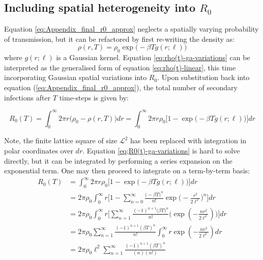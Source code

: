 \subsection{Including spatial heterogeneity into $R_0$}

\label{sec:r0-derivation}
Equation \ref{eq:Appendix_final_r0_approx} neglects a spatially varying probability of transmission, 
but it can be refactored by first re-writing the density as:
\begin{equation}
\label{eq:rho(t)-ga-variations}
    \rho(r, T) = \rho_0\exp \big(-\beta T g(r; \ell) \big)
\end{equation}
where $g(r;\ell)$ is a Gaussian kernel. 
Equation \ref{eq:rho(t)-ga-variations} can be interpreted as the generalised form of equation \ref{eq:rho(t)-linear}, this time incorporating Gaussian spatial variations into $R_0$.
Upon substitution back into equation (\ref{eq:Appendix_final_r0_approx}), the total number of secondary infections after $T$ time-steps is given by:

\begin{equation}
\label{eq;R0(t)-ga-variations}
   R_0(T) = \int ^\infty _0 2\pi r \big (\rho_0 - \rho(r, T)\big)dr =  \int ^\infty _0 2\pi r \rho_0 \Big[1 - \exp\big(-\beta T g(r;\ell)\big) \Big]dr
\end{equation}

Note, the finite lattice square of size $\mathcal{L}^2$ has been replaced with integration in polar coordinates over $dr$. 
Equation \ref{eq;R0(t)-ga-variations} is hard to solve directly, but it can be integrated by performing a series expansion on the exponential term. 
One may then proceed to integrate on a term-by-term basis:
\begin{equation} 
\label{eq:Appendix_final_expression}
\begin{split}
R_0(T) & = \int^\infty_0 2\pi r \rho_0 \Big[1 - \exp \big( -\beta T g(r;\ell)\big)\Big]dr \\
& = 2\pi\rho_0 \int^\infty _0 r \Big[1 - \sum^\infty_{n=0} \frac{\big(-\beta T)^n}{n!} \exp\big(-\frac{r^2}{2\ell^2}\big)^n  \Big] dr \\
& = 2\pi\rho_0 \int^\infty _0 r \Big[\sum^\infty_{n=1} \frac{(-1)^{n+1}\big(\beta T)^n}{n!} \Big(\exp(-\frac{n r^2}{2\ell^2} ) \Big)  \Big] dr \\
& = 2\pi\rho_0 \sum^{\infty}_{n=1} \frac{(-1)^{n+1} (\beta T)^n}{n!} \int^\infty _0 r \exp(-\frac{n r^2}{2\ell^2})dr  \\
& = 2\pi\rho_0 \ell^2 \sum^{\infty}_{n=1} \frac{(-1)^{n+1}(\beta T)^n}{(n)(n!) }
\end{split}
\end{equation}

